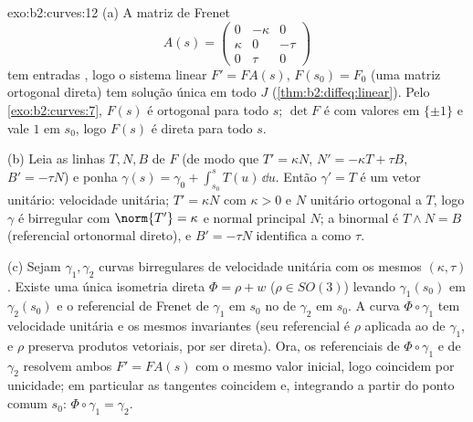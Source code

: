 \begin{solution}{exo:b2:curves:12}
(a) A matriz de Frenet
\[
A(s) = \begin{pmatrix} 0 & -\kappa & 0\\ \kappa & 0 & -\tau\\
0 & \tau & 0\end{pmatrix}
\]
tem entradas , logo o sistema linear $F' = FA(s)$,
$F(s_0) = F_0$ (uma matriz ortogonal direta) tem solução
única em todo $J$ (\cref{thm:b2:diffeq:linear}). Pelo
\cref{exo:b2:curves:7}, $F(s)$ é ortogonal para todo $s$;
$\det F$ é  com valores em $\{\pm1\}$ e vale
$1$ em $s_0$, logo $F(s)$ é direta para todo $s$.

(b) Leia as linhas $T, N, B$ de $F$ (de modo que $T' = \kappa
N$, $N' = -\kappa T + \tau B$, $B' = -\tau N$) e ponha
$\gamma(s) = \gamma_0 + \int_{s_0}^s T(u)\,\dd u$. Então
$\gamma' = T$ é um vetor unitário: velocidade unitária; $T' = \kappa N$
com $\kappa > 0$ e $N$ unitário ortogonal a $T$, logo $\gamma$
é birregular com  $\norm{T'} = \kappa$ e
normal principal $N$; a binormal é $T \wedge N = B$
(referencial ortonormal direto), e $B' = -\tau N$ identifica a
 como $\tau$.

(c) Sejam $\gamma_1, \gamma_2$ curvas birregulares de velocidade unitária
com os mesmos $(\kappa, \tau)$. Existe uma única isometria
direta $\Phi = \rho + w$ ($\rho \in SO(3)$) levando
$\gamma_1(s_0)$ em $\gamma_2(s_0)$ e o referencial de Frenet de
$\gamma_1$ em $s_0$ no de $\gamma_2$ em $s_0$. A curva
$\Phi\circ\gamma_1$ tem velocidade unitária e os mesmos invariantes
(seu referencial é $\rho$ aplicada ao de $\gamma_1$, e
$\rho$ preserva produtos vetoriais, por ser direta). Ora, os
referenciais de $\Phi\circ\gamma_1$ e de $\gamma_2$ resolvem ambos $F' =
FA(s)$ com o mesmo valor inicial, logo coincidem por
unicidade; em particular as tangentes coincidem e, integrando
a partir do ponto comum $s_0$: $\Phi\circ\gamma_1 = \gamma_2$.
\end{solution}

